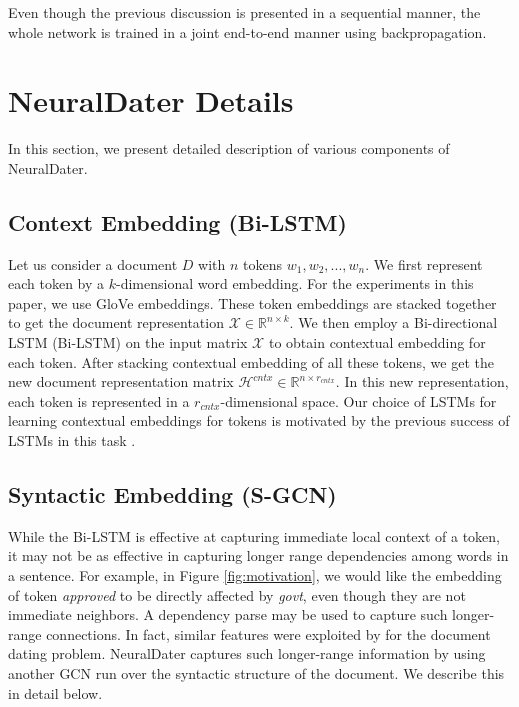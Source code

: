 \documentclass[11pt,a4paper]{article}
\newcommand{\reffig}[1]{Figure \ref{#1}}
\newcommand{\m}[1]{\mathcal{#1}}
\newcommand{\method}{NeuralDater}
\begin{document}
Even though the previous discussion is presented in a sequential manner, the whole network is trained in a joint end-to-end manner using backpropagation.

%
 \section{\method{} Details}

In this section, we present detailed description of various components of \method{}.

\subsection{Context Embedding (Bi-LSTM)}
\label{sec:et_gcn}

Let us consider a document $D$ with $n$ tokens  $w_1, w_2, ..., w_n$.
We first represent each token by a $k$-dimensional word embedding. For the experiments in this paper, we use GloVe \cite{glove} embeddings. These token embeddings are stacked together to get the document representation $\m{X} \in \mathbb{R}^{n \times k}$. We then employ a Bi-directional LSTM (Bi-LSTM) \cite{lstm_1997} on the input matrix $\m{X}$ to obtain contextual embedding for each token. After stacking contextual embedding of all these tokens, we get the new document representation matrix $\m{H}^{cntx} \in \mathbb{R}^{n \times r_{cntx}}$. In this new representation, each token is represented in a $r_{cntx}$-dimensional space. Our choice of LSTMs for learning contextual embeddings for tokens is motivated by the previous success of LSTMs in this task \cite{Sutskever:2014:SSL:2969033.2969173}.


\subsection{Syntactic Embedding (S-GCN)} 
\label{sec:syntax_gcn}

While the Bi-LSTM is effective at capturing immediate local context of a token, it may not be as effective in capturing longer range dependencies among words in a sentence. For example, in \reffig{fig:motivation}, we would like the embedding of token \textit{approved} to be directly affected by \textit{govt}, even though they are not immediate neighbors. A dependency parse may be used to capture such longer-range connections. In fact, similar features were exploited by \cite{Chambers:2012:LDT:2390524.2390539} for the document dating problem. \method{} captures such longer-range information by using another GCN run over the syntactic structure of the document. We describe this in detail below.
\end{document}
